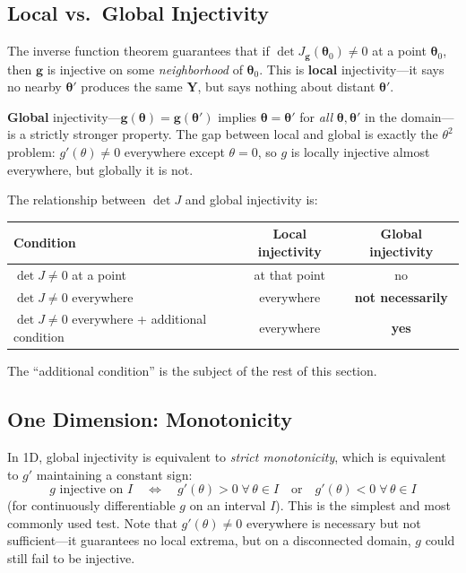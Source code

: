 \documentclass[11pt,a4paper]{article}
\theoremstyle{definition}
\newcommand{\btheta}{\boldsymbol{\theta}}
\begin{document}
\subsection{Local vs.\ Global Injectivity}

The inverse function theorem guarantees that if
$\det J_{\mathbf{g}}(\btheta_0) \neq 0$ at a point $\btheta_0$, then
$\mathbf{g}$ is injective on some \emph{neighborhood} of $\btheta_0$. This is
\textbf{local} injectivity---it says no nearby $\btheta'$ produces the same
$\mathbf{Y}$, but says nothing about distant $\btheta'$.

\textbf{Global} injectivity---$\mathbf{g}(\btheta) = \mathbf{g}(\btheta')$
implies $\btheta = \btheta'$ for \emph{all} $\btheta, \btheta'$ in the
domain---is a strictly stronger property. The gap between local and global
is exactly the $\theta^2$ problem: $g'(\theta) \neq 0$ everywhere except
$\theta = 0$, so $g$ is locally injective almost everywhere, but globally it
is not.

The relationship between $\det J$ and global injectivity is:
\begin{center}
\begin{tabular}{lcc}
    Condition & Local injectivity & Global injectivity \\
    \hline
    $\det J \neq 0$ at a point & at that point & no \\
    $\det J \neq 0$ everywhere & everywhere & \textbf{not necessarily} \\
    $\det J \neq 0$ everywhere + additional condition & everywhere & \textbf{yes} \\
\end{tabular}
\end{center}
The ``additional condition'' is the subject of the rest of this section.


\subsection{One Dimension: Monotonicity}

In 1D, global injectivity is equivalent to \emph{strict monotonicity}, which is
equivalent to $g'$ maintaining a constant sign:
\begin{equation}
    g \text{ injective on } I \quad\Longleftrightarrow\quad
    g'(\theta) > 0 \;\forall\, \theta \in I
    \quad\text{or}\quad g'(\theta) < 0 \;\forall\, \theta \in I
\end{equation}
(for continuously differentiable $g$ on an interval $I$). This is the simplest
and most commonly used test. Note that $g'(\theta) \neq 0$ everywhere is
necessary but not sufficient---it guarantees no local extrema, but on a
disconnected domain, $g$ could still fail to be injective.
\end{document}
